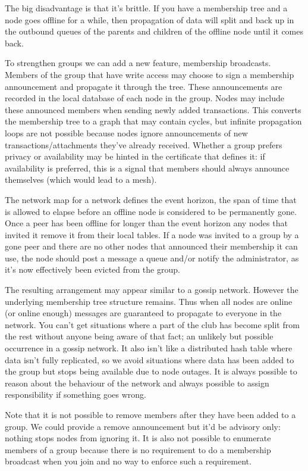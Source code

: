 \documentclass{article}
\begin{document}
The big disadvantage is that it's brittle. If you have a membership tree and a node goes offline for a while,
then propagation of data will split and back up in the outbound queues of the parents and children of the offline
node until it comes back.

To strengthen groups we can add a new feature, membership broadcasts. Members of the group that have write access may
choose to sign a membership announcement and propagate it through the tree. These announcements are recorded in the
local database of each node in the group. Nodes may include these announced members when sending newly added
transactions. This converts the membership tree to a graph that may contain cycles, but infinite propagation loops are
not possible because nodes ignore announcements of new transactions/attachments they've already received. Whether a group
prefers privacy or availability may be hinted in the certificate that defines it: if availability is preferred, this is
a signal that members should always announce themselves (which would lead to a mesh).

The network map for a network defines the event horizon, the span of time that is allowed to elapse before an offline
node is considered to be permanently gone. Once a peer has been offline for longer than the event horizon any nodes that
invited it remove it from their local tables. If a node was invited to a group by a gone peer and there are no other
nodes that announced their membership it can use, the node should post a message a queue and/or notify the
administrator, as it's now effectively been evicted from the group.

The resulting arrangement may appear similar to a gossip network. However the underlying membership tree structure
remains. Thus when all nodes are online (or online enough) messages are guaranteed to propagate to everyone in the
network. You can't get situations where a part of the club has become split from the rest without anyone being aware of
that fact; an unlikely but possible occurrence in a gossip network. It also isn't like a distributed hash table where
data isn't fully replicated, so we avoid situations where data has been added to the group but stops being available due
to node outages. It is always possible to reason about the behaviour of the network and always possible to assign
responsibility if something goes wrong.

Note that it is not possible to remove members after they have been added to a group. We could provide a remove
announcement but it'd be advisory only: nothing stops nodes from ignoring it. It is also not possible to enumerate
members of a group because there is no requirement to do a membership broadcast when you join and no way to enforce such
a requirement.
\end{document}
